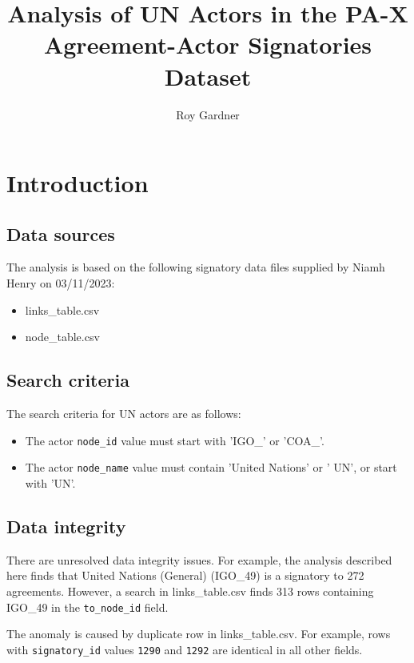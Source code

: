 \documentclass{article}
\title{Analysis of UN Actors in the PA-X Agreement-Actor Signatories Dataset}
\author{Roy Gardner}
\begin{document}

\maketitle

\tableofcontents
\newpage

\section{Introduction}

\subsection{Data sources}
The analysis is based on the following signatory data files supplied by Niamh Henry on 03/11/2023:

\begin{itemize}
\item links\_table.csv
\item node\_table.csv
\end{itemize}

\subsection{Search criteria}

The search criteria for UN actors are as follows:

\begin{itemize}
\item The actor \texttt{node\_id} value must start with 'IGO\_' or 'COA\_'.
\item The actor \texttt{node\_name} value must contain 'United Nations' or ' UN', or start with 'UN'.
\end{itemize}

\subsection{Data integrity}

There are unresolved data integrity issues. For example, the analysis described here finds that United Nations (General) (IGO\_49) is a signatory to 272 agreements. However, a search in links\_table.csv finds 313 rows containing IGO\_49 in the  \texttt{to\_node\_id} field. \newline

The anomaly is caused by duplicate row in links\_table.csv. For example, rows with \texttt{signatory\_id} values \texttt{1290} and \texttt{1292} are identical in all other fields.\newline
\end{document}
